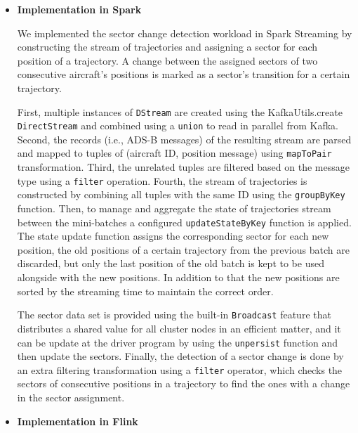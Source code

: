 \documentclass[]{article}
\begin{document}
 \begin{itemize}
 \item {\bf{Implementation in Spark }}
 
 We implemented the sector change detection workload in Spark Streaming by constructing the stream of trajectories and assigning a sector for each position of a trajectory. A change between the assigned sectors of two consecutive aircraft's positions is marked  as a sector's transition for a certain trajectory. \par First, multiple instances of \texttt{DStream} are created using the KafkaUtils.create \texttt{DirectStream} and combined using a \texttt{union} to read in  parallel from Kafka. Second, the records (i.e., ADS-B messages) of the resulting stream are parsed and mapped to tuples of (aircraft ID, position message) using \texttt{mapToPair} transformation. Third, the unrelated  tuples are filtered based on the message type using a \texttt{filter} operation. Fourth, the stream of trajectories is constructed by combining all tuples with the same ID using the \texttt{groupByKey} function. Then, to manage and aggregate the state of trajectories stream between the mini-batches a configured \texttt{updateStateByKey} function is applied. The state update function assigns the corresponding sector for each new position, the old positions of a certain trajectory from the previous batch are discarded, but only the last position of the old batch is kept to be used alongside with the new positions. In addition to that the new positions are sorted by the streaming time to maintain the correct order.
 \par The sector data set is provided using the built-in \texttt{Broadcast} feature that distributes a shared value for  all cluster nodes in an efficient matter, and it can be update at the driver program by using the \texttt{unpersist} function and then update the sectors. Finally, the detection of a sector change is done by an extra filtering transformation using a \texttt{filter} operator, which checks the sectors of consecutive positions in a trajectory to find the ones with a change in the sector assignment.

 
  
 \item {\bf{Implementation in Flink }}
 

\end{itemize}
\end{document}
